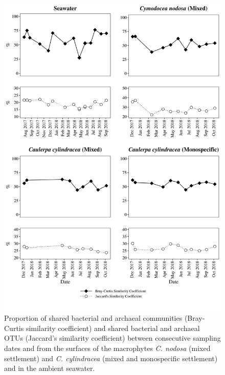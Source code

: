\documentclass[12pt,]{article}
\begin{document}
\begin{figure}[H]

{\centering \includegraphics[width=0.85\linewidth]{../results/figures/seasonal_shared} 

}

\caption{Proportion of shared bacterial and archaeal communities (Bray-Curtis similarity coefficient) and shared bacterial and archaeal OTUs (Jaccard's similarity coefficient) between consecutive sampling dates and from the surfaces of the macrophytes \textit{C. nodosa} (mixed settlement) and \textit{C. cylindracea} (mixed and monospecific settlement) and in the ambient seawater.\label{shared}}\label{fig:unnamed-chunk-2}
\end{figure}
\end{document}
